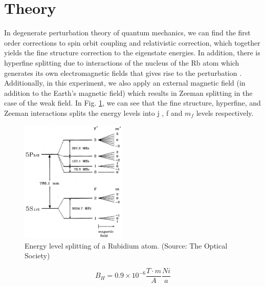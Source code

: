 \documentclass{sigchi}
\begin{document}
\section{Theory}\label{sec:theory}
\par In degenerate perturbation theory of quantum mechanics, we can find the first order corrections to spin orbit coupling and relativistic correction, which together yields the fine structure correction to the eigenstate energies. In addition, there is hyperfine splitting due to interactions of the nucleus of the Rb atom which generates its own electromagnetic fields that gives rise to the perturbation \cite{wiki_hyperfine}.  Additionally, in this experiment, we also apply an external magnetic field (in addition to the Earth's magnetic field) which results in Zeeman splitting in the case of the weak field. In Fig. \ref{splitting}, we can see that the fine structure, hyperfine, and Zeeman interactions splits the energy levels into j , f and $m_f$ levels respectively.
\begin{figure}[h]
\includegraphics[width=0.45\textwidth]{plots/splitting_diagram.jpeg}
\caption{Energy level splitting of a Rubidium atom. (Source: The Optical Society)}
\label{splitting}
\end{figure}
\begin{equation}\label{currentB}
B_{H} = 0.9\times 10^{-6} \frac{T\cdot m}{A} \frac{N i}{a}
\end{equation}
\end{document}
